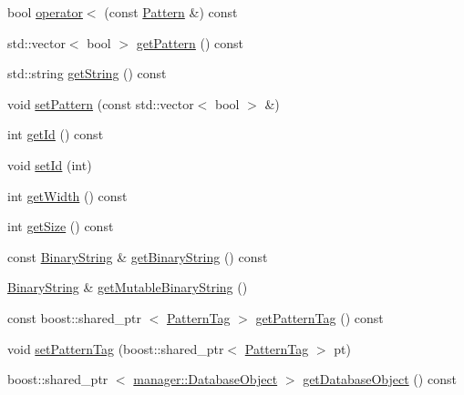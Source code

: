 \begin{DoxyCompactItemize}
\item 
bool \hyperlink{classcryomesh_1_1state_1_1Pattern_ad3fb10247785d26c3cf150f7e69df35a}{operator$<$} (const \hyperlink{classcryomesh_1_1state_1_1Pattern}{\-Pattern} \&) const 
\item 
std\-::vector$<$ bool $>$ \hyperlink{classcryomesh_1_1state_1_1Pattern_ab6fe1d9bee48f3bdaffb0cf683de4d17}{get\-Pattern} () const 
\item 
std\-::string \hyperlink{classcryomesh_1_1state_1_1Pattern_a963b252435300f16df7599c56751555b}{get\-String} () const 
\item 
void \hyperlink{classcryomesh_1_1state_1_1Pattern_acf193a66c3a2e41d99f40b2666687ad9}{set\-Pattern} (const std\-::vector$<$ bool $>$ \&)
\item 
int \hyperlink{classcryomesh_1_1state_1_1Pattern_a34597e6294ffb843326b654991aceb2f}{get\-Id} () const 
\item 
void \hyperlink{classcryomesh_1_1state_1_1Pattern_a8ca895dafdf58ae592f41be1d8d6173a}{set\-Id} (int)
\item 
int \hyperlink{classcryomesh_1_1state_1_1Pattern_a77793823c718ec5bacf59d3908950390}{get\-Width} () const 
\item 
int \hyperlink{classcryomesh_1_1state_1_1Pattern_a448d14d09a39d35182bef8169511faf8}{get\-Size} () const 
\item 
const \hyperlink{classcryomesh_1_1state_1_1BinaryString}{\-Binary\-String} \& \hyperlink{classcryomesh_1_1state_1_1Pattern_a57b18a4b690c70821e7d84847a56d7b9}{get\-Binary\-String} () const 
\item 
\hyperlink{classcryomesh_1_1state_1_1BinaryString}{\-Binary\-String} \& \hyperlink{classcryomesh_1_1state_1_1Pattern_a22e7fa5faa704b0d95c022d1dc5d67aa}{get\-Mutable\-Binary\-String} ()
\item 
const boost\-::shared\-\_\-ptr\*
$<$ \hyperlink{classcryomesh_1_1state_1_1PatternTag}{\-Pattern\-Tag} $>$ \hyperlink{classcryomesh_1_1state_1_1Pattern_aec6c5defbc96290f03a2178bbd08a626}{get\-Pattern\-Tag} () const 
\item 
void \hyperlink{classcryomesh_1_1state_1_1Pattern_afae212fb317cf86e70ee93b9a0c6ea21}{set\-Pattern\-Tag} (boost\-::shared\-\_\-ptr$<$ \hyperlink{classcryomesh_1_1state_1_1PatternTag}{\-Pattern\-Tag} $>$ pt)
\item 
boost\-::shared\-\_\-ptr\*
$<$ \hyperlink{classcryomesh_1_1manager_1_1DatabaseObject}{manager\-::\-Database\-Object} $>$ \hyperlink{classcryomesh_1_1state_1_1Pattern_a2dd3aa753f926b674aa73688a932ebf7}{get\-Database\-Object} () const 
\end{DoxyCompactItemize}
